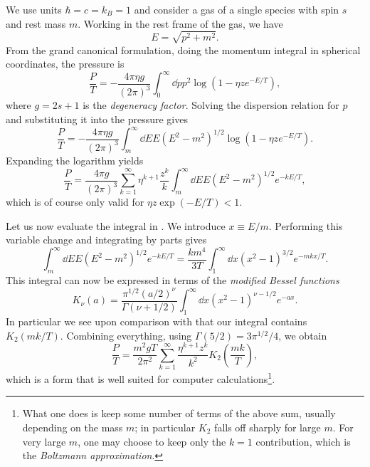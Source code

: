 We use units $\hbar=c=k_B=1$ and consider a gas of a single species
with spin $s$ and rest mass $m$. Working in the rest frame of the gas,
we have
\begin{equation}\label{eq:dispersion}
  E=\sqrt{p^2+m^2}.  
\end{equation}
From the grand canonical formulation,
doing the momentum integral in spherical coordinates, the pressure is
\begin{equation}
  \frac{P}{T}=-\frac{4\pi\eta g}{(2\pi)^3}\int_0^\infty 
      \dd{p}p^2\log\left(1-\eta z e^{-E/T}\right),
\end{equation}
where $g=2s+1$ is the {\it degeneracy factor}. 
Solving the dispersion relation
for $p$ and substituting it into the pressure gives
\begin{equation}
  \frac{P}{T}=-\frac{4\pi\eta g}{(2\pi)^3}\int_m^\infty 
      \dd{E}E\left(E^2-m^2\right)^{1/2}\log\left(1-\eta z e^{-E/T}\right).
\end{equation}
Expanding the logarithm yields
\begin{equation}\label{eq:pressE}
  \frac{P}{T}=\frac{4\pi g}{(2\pi)^3}\sum_{k=1}^\infty\eta^{k+1}\frac{z^k}{k}\int_m^\infty 
      \dd{E}E\left(E^2-m^2\right)^{1/2}e^{-kE/T},
\end{equation}
which is of course only valid for $\eta z\exp(-E/T)<1$.

Let us now evaluate the integral in . We introduce
$x\equiv E/m$. Performing this variable change and integrating by parts gives
\begin{equation}\label{eq:pressint}
  \int_m^\infty\dd{E}E\left(E^2-m^2\right)^{1/2}e^{-kE/T}
  =\frac{km^4}{3T}\int_1^\infty\dd x\left(x^2-1\right)^{3/2}e^{-mkx/T}.
\end{equation}
This integral can now be expressed in terms of the
{\it modified Bessel functions}
\begin{equation}
  K_\nu(a)=\frac{\pi^{1/2}(a/2)^\nu}{\Gamma(\nu+1/2)}
             \int_1^\infty\dd x(x^2-1)^{\nu-1/2}e^{-ax}.
\end{equation}
In particular we see upon comparison with 
that our integral contains $K_2(mk/T)$. Combining everything,
using $\Gamma(5/2)=3\pi^{1/2}/4$, we obtain
\begin{equation}\label{eq:pressrelQM}
  \frac{P}{T}=\frac{m^2gT}{2\pi^2}\sum_{k=1}^\infty\frac{\eta^{k+1}z^k}{k^2}
                         K_2\left(\frac{mk}{T}\right),
\end{equation}
which is a form that is well suited for computer calculations\footnote{What
one does is keep some number of terms of the above sum, usually depending
on the mass $m$; in particular $K_2$ falls off sharply for large $m$.
For very large $m$, one may choose to keep only the $k=1$ contribution,
which is the {\it Boltzmann approximation}.}.

